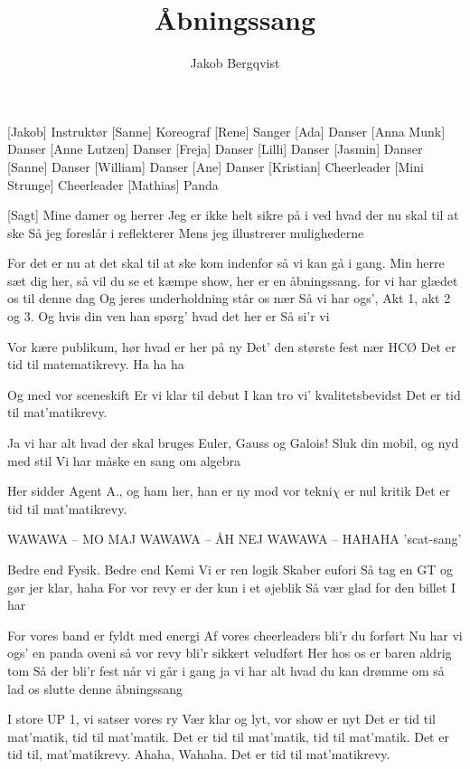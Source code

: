 \documentclass[a4paper,11pt]{article}
\title{Åbningssang}
\author{Jakob Bergqvist}
\begin{document}
\maketitle

\begin{roles}
[Jakob] Instruktør
[Sanne] Koreograf
[Rene] Sanger
[Ada] Danser
[Anna Munk] Danser
[Anne Lutzen] Danser
[Freja] Danser
[Lilli] Danser
[Jasmin] Danser
[Sanne] Danser
[William] Danser
[Ane] Danser
[Kristian] Cheerleader
[Mini Strunge] Cheerleader
[Mathias] Panda
\end{roles}
\begin{props}
\end{props}

\begin{song} 
  [Sagt] Mine damer og herrer 
Jeg er ikke helt sikre på i ved hvad der nu skal til at ske
Så jeg foreslår i reflekterer
Mens jeg illustrerer mulighederne

For det er nu at det skal til at ske
kom indenfor så vi kan gå i gang.
Min herre sæt dig her, så vil du se
et kæmpe show, her er en åbningssang.
for vi har glædet os til denne dag
Og jeres underholdning står os nær
Så vi har ogs', Akt 1, akt 2 og 3.
Og hvis din ven han spørg' hvad det her er
Så si'r vi
 

Vor kære publikum, hør hvad er her på ny
Det' den største fest nær HCØ
Det er tid til matematikrevy.
Ha ha ha


Og med vor sceneskift
Er vi klar til debut
I kan tro vi' kvalitetsbevidst
Det er tid til mat'matikrevy.
 

Ja vi har alt hvad der skal bruges
Euler, Gauss og Galois!
Sluk din mobil, og nyd med stil
Vi har måske en sang om algebra

 
Her sidder Agent A., og ham her, han er ny
mod vor tekni$\chi$ er nul kritik
Det er tid til mat'matikrevy.
 

WAWAWA – MO MAJ
WAWAWA – ÅH NEJ
WAWAWA – HAHAHA
'scat-sang'

 
Bedre end Fysik.
Bedre end Kemi
Vi er ren logik
Skaber eufori
Så tag en GT
og gør jer klar, haha
For vor revy er der kun i et øjeblik
Så vær glad for den billet I har
 

For vores band er fyldt med energi
Af vores cheerleaders bli'r du forført
Nu har vi ogs' en panda oveni
så vor revy bli'r sikkert veludført
Her hos os er baren aldrig tom
Så der bli'r fest når vi går i gang
ja vi har alt hvad du kan drømme om
så lad os slutte denne åbningssang
 

I store UP 1, vi satser vores ry
Vær klar og lyt, vor show er nyt
Det er tid til mat'matik, tid til mat'matik.
Det er tid til mat'matik, tid til mat'matik.
Det er tid til, mat'matikrevy.
Ahaha, Wahaha.
Det er tid til mat'matikrevy.

\end{song}
\end{document}
